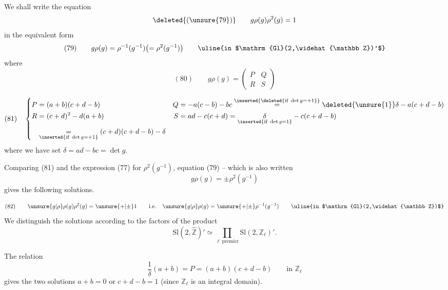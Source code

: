 We shall write the equation
\[
\deleted{(\unsure{79})}\qquad g\rho(g)\rho^2(g)=1
\]
in the equivalent form
\[
(79)\qquad g\rho(g)=\rho^{-1}(g^{-1})\bigl(=\rho^2(g^{-1})\bigr)
\qquad\text{\uline{in $\mathrm{Gl}(2,\widehat{\mathbb Z})'$}}
\]
where
\[
(80)\qquad g\rho(g)=\begin{pmatrix}P&Q\\R&S\end{pmatrix}
\]


\[
(81)\quad
\left\{\begin{aligned}
P&=(a+b)(c+d-b)&Q&=-a(c-b)-bc\overset{\inserted{\deleted{\text{if }\det g=+1}}}{=}\deleted{\unsure{1}}\delta-a(c+d-b)\\
R&=(c+d)^2-d(a+b)&S&=ad-c(c+d)=\underset{\inserted{\text{if }\det g=1}}{\delta}-c(c+d-b)\\
&\underset{\inserted{\text{if }\det g=+1}}{=}(c+d)(c+d-b)-\delta
\end{aligned}\right.
\]
where we have set $\delta=ad-bc=\det g$.

Comparing (81) and the expression (77) for $\rho^2(g^{-1})$, equation (79) -- which is also written
\[
g\rho(g)=\pm\rho^2(g^{-1})
\]
gives the following solutions.


\[
(82)\qquad \unsure{g|\rho}\rho(g)\rho^2(g)=\unsure{+|\pm}1\qquad\text{i.e.}\quad \unsure{g|\rho}\rho(g)=\unsure{+|\pm}\rho^{-1}(g^{-1})\qquad\text{\uline{in $\mathrm{Gl}(2,\widehat{\mathbb Z})$}}
\]
We distinguish the solutions according to the factors of the product
\[
\mathrm{Sl}(2,\widehat{\mathbb Z})'\simeq\prod_{\ell\ \mathrm{premier}}\mathrm{Sl}(2,\mathbb Z_\ell)'.
\]

The relation
\[
\frac1\delta(a+b)=P=(a+b)(c+d-b)\qquad\text{in }\mathbb Z_\ell
\]
gives the two solutions $a+b=0$ or $c+d-b=1$ (since $\mathbb Z_\ell$ is an integral domain).


